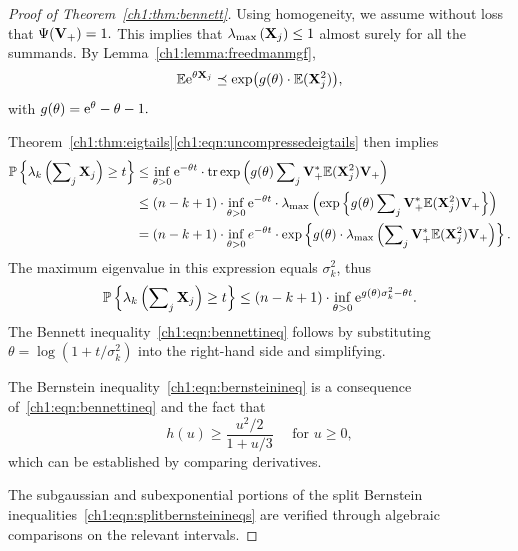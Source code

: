 \begin{proof}[Proof of Theorem~\ref{ch1:thm:bennett}]
Using homogeneity, we assume without loss that $\Psi(\mathbf{V}_+)=1.$ This
implies that $\lambda_{\mathrm{max}}\left(\mathbf{X}_j\right) \leq 1$ almost surely for all the summands.
By Lemma~\ref{ch1:lemma:freedmanmgf},
\[
\mathbb{E}\mathrm{e}^{\theta \mathbf{X}_j} \preceq \mathrm{exp}\big( g(\theta) \cdot \mathbb{E}(\mathbf{X}_j^2) \big),
\]
with $g(\theta) = \mathrm{e}^\theta - \theta - 1.$ 

Theorem~\ref{ch1:thm:eigtails}\eqref{ch1:eqn:uncompressedeigtails} then implies
\begin{align*}
\mathbb{P}\left\{\lambda_k\left(\sum\nolimits_j \mathbf{X}_j \right) \geq t \right\} & \leq
\inf_{\theta > 0} \mathrm{e}^{-\theta t} \cdot \operatorname{tr}\mathrm{exp}\left(g(\theta) \sum\nolimits_j
\mathbf{V}_{+}^*\mathbb{E} (\mathbf{X}_j^2)\mathbf{V}_{+}\right) \\
 & \leq (n-k+1) \cdot \inf_{\theta >0} \mathrm{e}^{-\theta t} \cdot
\lambda_{\mathrm{max}}\left(\mathrm{exp}\left\{g(\theta)\sum\nolimits_j
\mathbf{V}_{+}^*\mathbb{E}(\mathbf{X}_j^2)\mathbf{V}_{+} \right\}\right) \\
& = (n-k+1) \cdot \inf_{\theta > 0} e^{-\theta t} \cdot \mathrm{exp}\left\{ g(\theta)
\cdot \lambda_{\mathrm{max}}\left(\sum\nolimits_j \mathbf{V}_{+}^*\mathbb{E}(\mathbf{X}_j^2)\mathbf{V}_{+} \right)
\right\}.
\end{align*}
The maximum eigenvalue in this expression equals $\sigma_k^2$, thus
\[ 
\mathbb{P}\left\{\lambda_k\left(\sum\nolimits_j \mathbf{X}_j \right) \geq t\right\} \leq (n-k+1)
\cdot \inf_{\theta >0 } \mathrm{e}^{g(\theta) \sigma_k^2 -\theta t}.
\]
The Bennett inequality~\eqref{ch1:eqn:bennettineq} follows by substituting $\theta =
\log(1 + t/\sigma_k^2)$ into the right-hand side and simplifying.

The Bernstein inequality~\eqref{ch1:eqn:bernsteinineq} is a consequence of~\eqref{ch1:eqn:bennettineq}
and the fact that 
\[
 h(u) \geq \frac{u^2/2}{1 + u/3} \quad \text{ for } u \geq 0,
\]
which can be established by comparing derivatives.

The subgaussian and subexponential portions of the split Bernstein 
inequalities~\eqref{ch1:eqn:splitbernsteinineqs} are verified through algebraic comparisons on
the relevant intervals.
\end{proof}

